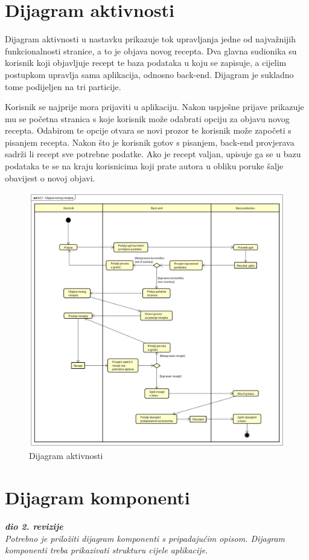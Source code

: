 			
			\eject 
		
		\section{Dijagram aktivnosti}
			
			
			 Dijagram aktivnosti u nastavku prikazuje tok upravljanja jedne od najvažnijih funkcionalnosti stranice, a to je objava novog recepta. Dva glavna sudionika su korisnik koji objavljuje recept te baza podataka u koju se zapisuje, a cijelim postupkom upravlja sama aplikacija, odnosno back-end. Dijagram je sukladno tome podijeljen na tri particije.
			 
			 Korisnik se najprije mora prijaviti u aplikaciju. Nakon uspješne prijave prikazuje mu se početna stranica s koje korisnik može odabrati opciju za objavu novog recepta. Odabirom te opcije otvara se novi prozor te korisnik može započeti s pisanjem recepta. Nakon što je korisnik gotov s pisanjem, back-end provjerava sadrži li recept sve potrebne podatke. Ako je recept valjan, upisuje ga se u bazu podataka te se na kraju korisnicima koji prate autora u obliku poruke šalje obavijest o novoj objavi.
			 \begin{figure}
			 	\includegraphics[scale=0.41]{slike/dijagram_aktivnosti.png}
			 	\centering
			 	\caption{Dijagram aktivnosti}
			 	\label{fig:Dijagram_aktivnosti}
			 \end{figure}
			 
			\eject
		\section{Dijagram komponenti}
		
			\textbf{\textit{dio 2. revizije}}\\
		
			 \textit{Potrebno je priložiti dijagram komponenti s pripadajućim opisom. Dijagram komponenti treba prikazivati strukturu cijele aplikacije.}